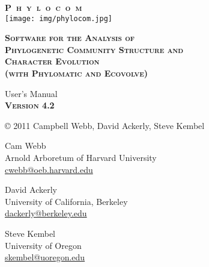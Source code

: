 \documentclass[12pt,letterpaper]{article}
\newcommand{\phylocomversion}{4.2}
\begin{document}
\sloppy
\thispagestyle{empty}

\begin{center}
{\sffamily \bfseries \scshape {\huge P~h~y~l~o~c~o~m \\}}
\bigskip \bigskip
\texttt{[image: img/phylocom.jpg]}
\bigskip \bigskip

{\sffamily \bfseries \scshape {\Large Software for the Analysis of \\
Phylogenetic Community Structure and \\ Character Evolution \\ (with
Phylomatic and Ecovolve)\\}

\bigskip \bigskip

{\Large User's Manual \\}
\bigskip \bigskip
{\sffamily \bfseries \scshape \large Version \phylocomversion\\}
\bigskip \bigskip

{\textnormal \copyright} 2011 Campbell Webb, David Ackerly, Steve Kembel
\bigskip \bigskip

{\large Cam Webb\\}
Arnold Arboretum of Harvard University\\
\href{mailto:cwebb@oeb.harvard.edu}{cwebb@oeb.harvard.edu}\\

\bigskip \bigskip

{\large David Ackerly\\}
University of California, Berkeley\\
\href{mailto:dackerly@berkeley.edu}{dackerly@berkeley.edu}

\bigskip \bigskip

{\large Steve Kembel\\}
University of Oregon\\
\href{mailto:skembel@uoregon.edu}{skembel@uoregon.edu}
  }
\end{center}



\newpage

\pagestyle{fancy}
 \chead{} 
 \cfoot{\thepage} 
 \renewcommand{\headrulewidth}{0.4pt} 
 \renewcommand{\footrulewidth}{0.4pt} 
\end{document}
